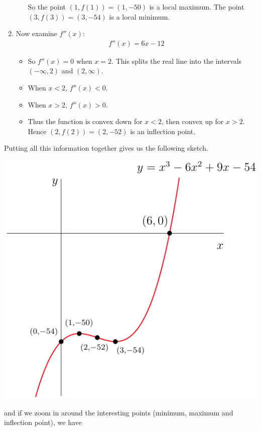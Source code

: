\begin{eg}[$f(x) = x^3 - 6x^2 + 9x - 54$]
\begin{enumerate}[(1)]
\begin{itemize}
So the point $(1,f(1))=(1,-50)$ is a local maximum. The point
$(3,f(3))=(3,-54)$ is a local minimum.
\end{itemize}
\item Now examine $f''(x)$:
\begin{align*}
f''(x) = 6x-12
\end{align*}
\begin{itemize}
\item So $f''(x)=0$ when $x=2$. This splits the real line into the intervals
$(-\infty,2)$ and $(2,\infty)$.
 \item When $x<2$,  $f''(x)<0$.
 \item When $x>2$, $f''(x)>0$.
\item Thus the function is convex down for $x<2$, then convex up for $x>2$.
Hence $(2,f(2))=(2,-52)$ is an inflection point.
\end{itemize}
\end{enumerate}
Putting all this information together gives us the following sketch.
\begin{efig}
\begin{center}
   \includegraphics{sketch4}
\end{center}
\end{efig}
and if we zoom in around the interesting points (minimum, maximum and
inflection point), we have
\begin{efig}
\begin{center}

\end{center}
\end{efig}
\end{eg}
